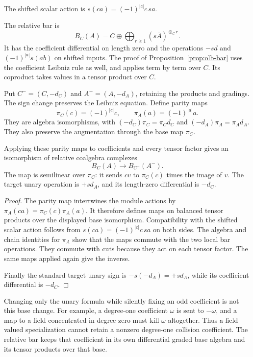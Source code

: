 The shifted scalar action is
$s(ca)=(-1)^{|c|}c\,sa$.

The relative bar is
\[
 B_C(A)=C\oplus\bigoplus_{r\geq1}(s\bar A)^{\otimes_C r}.
\]
It has the coefficient differential on length zero and the
operations $-sd$ and $(-1)^{|a|}s(ab)$ on shifted inputs.
The proof of Proposition~\ref{prop:olb-bar} uses the coefficient
Leibniz rule as well, and applies term by term over $C$.
Its coproduct takes values in a tensor product over $C$.

Put $C^-=(C,-d_C)$ and $A^-=(A,-d_A)$, retaining the products
and gradings.  The sign change preserves the Leibniz equation.
Define parity maps
\[
 \pi_C(c)=(-1)^{|c|}c,\qquad \pi_A(a)=(-1)^{|a|}a.
\]
They are algebra isomorphisms, with
$(-d_C)\pi_C=\pi_Cd_C$ and
$(-d_A)\pi_A=\pi_Ad_A$.
They also preserve the augmentation through the base map $\pi_C$.

\begin{proposition}\label{prop:olb-relative-parity}
Applying these parity maps to coefficients and every tensor factor gives
an isomorphism of relative coalgebra complexes
\[
 B_C(A)\longrightarrow B_{C^-}(A^-).
\]
The map is semilinear over $\pi_C$: it sends $cv$ to
$\pi_C(c)$ times the image of $v$.
The target unary operation is $+s d_A$, and its length-zero
differential is $-d_C$.
\end{proposition}

\begin{proof}
The parity map intertwines the module actions by
$\pi_A(ca)=\pi_C(c)\pi_A(a)$.
It therefore defines maps on balanced tensor products over the
displayed base isomorphism.
Compatibility with the shifted scalar action follows from
$s(ca)=(-1)^{|c|}c\,sa$ on both sides.
The algebra and chain identities for $\pi_A$ show that the maps
commute with the two local bar operations.
They commute with cuts because they act on each tensor factor.
The same maps applied again give the inverse.

Finally the standard target unary sign is
$-s(-d_A)=+s d_A$, while its coefficient differential is $-d_C$.
\end{proof}

Changing only the unary formula while silently fixing an odd
coefficient is not this base change.
For example, a degree-one coefficient $\omega$ is sent to
$-\omega$, and a map to a field concentrated in degree zero
must kill $\omega$ altogether.
Thus a field-valued specialization cannot retain a nonzero
degree-one collision coefficient.
The relative bar keeps that coefficient in its own differential
graded base algebra and its tensor products over that base.

